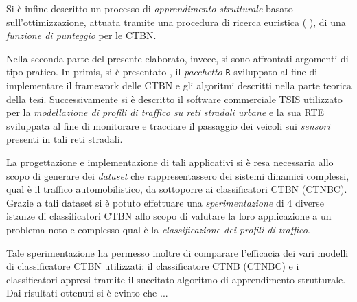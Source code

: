 Si è infine descritto un processo di \emph{apprendimento strutturale} basato sull'ottimizzazione, attuata tramite una procedura di ricerca euristica (\ie{} \emph{\hc{}}), di una \emph{funzione di punteggio} per le \acs{CTBN}.

Nella seconda parte del presente elaborato, invece, si sono affrontati argomenti di tipo pratico. In primis, si è presentato \rctbn{}, il \emph{pacchetto} \lstinline$R$ sviluppato al fine di implementare il framework delle \acs{CTBN} e gli algoritmi descritti nella parte teorica della tesi. Successivamente si è descritto il software commerciale \acs{TSIS} utilizzato per la \emph{modellazione di profili di traffico su reti stradali urbane} e la sua \acl{RTE} sviluppata al fine di monitorare e tracciare il passaggio dei veicoli sui \emph{sensori} presenti in tali reti stradali.

La progettazione e implementazione di tali applicativi si è resa necessaria allo scopo di generare dei \emph{dataset} che rappresentassero dei sistemi dinamici complessi, qual è il traffico automobilistico, da sottoporre ai classificatori \acs{CTBN} (\acs{CTNBC}). Grazie a tali dataset si è potuto effettuare una \emph{sperimentazione} di $4$ diverse istanze di classificatori \acs{CTBN} allo scopo di valutare la loro applicazione a un problema noto e complesso qual è la \emph{classificazione dei profili di traffico}.

Tale sperimentazione ha permesso inoltre di comparare l'efficacia dei vari modelli di classificatore \acs{CTBN} utilizzati: il classificatore \acl{CTNB} (\acs{CTNBC}) e i classificatori appresi tramite il succitato algoritmo di apprendimento strutturale. Dai risultati ottenuti si è evinto che ...


